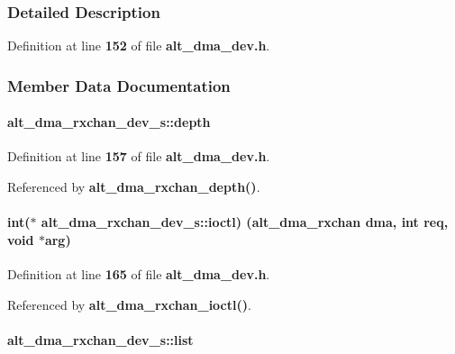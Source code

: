 \subsubsection{Detailed Description}


Definition at line {\bf 152} of file {\bf alt\+\_\+dma\+\_\+dev.\+h}.



\subsubsection{Member Data Documentation}
\paragraph[{depth}]{ alt\+\_\+dma\+\_\+rxchan\+\_\+dev\+\_\+s\+::depth}\label{structalt__dma__rxchan__dev__s_a83c5ca83ecb943f1b345621d750fb693}


Definition at line {\bf 157} of file {\bf alt\+\_\+dma\+\_\+dev.\+h}.



Referenced by {\bf alt\+\_\+dma\+\_\+rxchan\+\_\+depth()}.

\paragraph[{ioctl}]{\setlength{\rightskip}{0pt plus 5cm}int($\ast$ alt\+\_\+dma\+\_\+rxchan\+\_\+dev\+\_\+s\+::ioctl) ({\bf alt\+\_\+dma\+\_\+rxchan} dma, int req, void $\ast$arg)}\label{structalt__dma__rxchan__dev__s_a48033fcb87cca7114edca58bc8ec4285}


Definition at line {\bf 165} of file {\bf alt\+\_\+dma\+\_\+dev.\+h}.



Referenced by {\bf alt\+\_\+dma\+\_\+rxchan\+\_\+ioctl()}.

\paragraph[{list}]{ alt\+\_\+dma\+\_\+rxchan\+\_\+dev\+\_\+s\+::list}\label{structalt__dma__rxchan__dev__s_a5bfbd398d4d98f88fcdbff91cad2560e}


